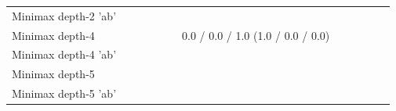 \documentclass[12pt]{article}
\begin{document}
\begin{table}[h]
\begin{tabular}{llllllllllll}
Minimax depth-2 'ab'            &                                                                                                                               &                   &                                   &                                             &                      &                                                              &                      &                   &                      &                                           &                            \\
Minimax depth-4                 &                                                                                                                               &                   &                                   &                                             &                      & 0.0 / 0.0 / 1.0 (1.0 / 0.0 / 0.0)                            &                      &                   &                      &                                           &                            \\
Minimax depth-4 'ab'            &                                                                                                                               &                   &                                   &                                             &                      &                                                              &                      &                   &                      &                                           &                            \\
Minimax depth-5                 &                                                                                                                               &                   &                                   &                                             &                      &                                                              &                      &                   &                      &                                           &                            \\
Minimax depth-5 'ab'            &                                                                                                                               &                   &                                   &                                             &                      &                                                              &                      &                   &                      &                                           &                            \\

\end{tabular}
\end{table}
\end{document}
